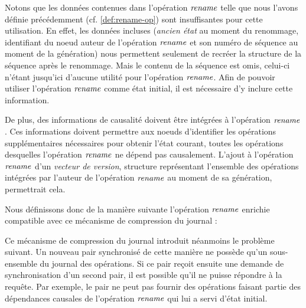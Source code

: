 Notons que les données contenues dans l'opération $\mathit{rename}$ telle que nous l'avons définie précédemment (cf. \autoref{def:rename-op}) sont insuffisantes pour cette utilisation.
En effet, les données incluses (\emph{ancien état} au moment du renommage, identifiant du noeud auteur de l'opération $\mathit{rename}$ et son numéro de séquence au moment de la génération) nous permettent seulement de recréer la structure de la séquence après le renommage.
Mais le contenu de la séquence est omis, celui-ci n'étant jusqu'ici d'aucune utilité pour l'opération $\mathit{rename}$.
Afin de pouvoir utiliser l'opération $\mathit{rename}$ comme état initial, il est nécessaire d'y inclure cette information.

De plus, des informations de causalité doivent être intégrées à l'opération $\mathit{rename}$.
Ces informations doivent permettre aux noeuds d'identifier les opérations supplémentaires nécessaires pour obtenir l'état courant, \ie toutes les opérations desquelles l'opération $\mathit{rename}$ ne dépend pas causalement.
L'ajout à l'opération $\mathit{rename}$ d'un \emph{vecteur de version}, structure représentant l'ensemble des opérations intégrées par l'auteur de l'opération $\mathit{rename}$ au moment de sa génération, permettrait cela.

Nous définissons donc de la manière suivante l'opération $\mathit{rename}$ enrichie compatible avec ce mécanisme de compression du journal :

\indent{}
Ce mécanisme de compression du journal introduit néanmoins le problème suivant.
Un nouveau pair synchronisé de cette manière ne possède qu'un sous-ensemble du journal des opérations.
Si ce pair reçoit ensuite une demande de synchronisation d'un second pair, il est possible qu'il ne puisse répondre à la requête.
Par exemple, le pair ne peut pas fournir des opérations faisant partie des dépendances causales de l'opération $\mathit{rename}$ qui lui a servi d'état initial.

